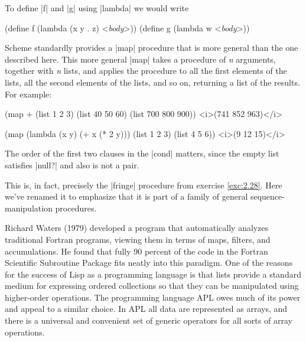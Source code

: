\begin{Exercise}
\begin{Exercise}
\begin{Exercise}
\begin{Exercise}
\begin{Exercise}
\begin{Exercise}
\begin{Exercise}
\begin{Exercise}
\begin{Exercise}
\begin{Exercise}
\begin{Exercise}
\begin{Exercise}
To define \scheme|f| and \scheme|g| using
\scheme|lambda| we would write
\begin{schemedisplay}
(define f (lambda (x y . z) <\textit{body}>))
(define g (lambda w <\textit{body}>))
\end{schemedisplay}

Scheme
standardly provides a \scheme|map| procedure that is more general
than the one described here.
This more general \scheme|map|
takes a procedure of \textit{n} arguments, together with \textit{n} lists, and
applies the procedure to all the first elements of
the lists, all the second elements of the lists, and so on,
returning a list of the results.  For example:
\begin{schemedisplay}
(map + (list 1 2 3) (list 40 50 60) (list 700 800 900))
<i>(741 852 963)</i>

(map (lambda (x y) (+ x (* 2 y)))
     (list 1 2 3)
     (list 4 5 6))
<i>(9 12 15)</i>
\end{schemedisplay}



The order of the
first two clauses in the \scheme|cond| matters, since the empty list
satisfies \scheme|null?| and also is not a pair.

This is, in fact, precisely the \scheme|fringe| procedure from
exercise \ref{exc:2.28}.  Here we've renamed it to emphasize that
it is part of a family of general sequence-manipulation procedures.

Richard Waters (1979)
developed a program that automatically analyzes traditional Fortran
programs, viewing them in terms of maps, filters, and accumulations.
He found that fully 90 percent of the code in the Fortran Scientific
Subroutine Package fits neatly into this paradigm.  One of the reasons
for the success of Lisp as a programming language is that lists
provide a standard medium for expressing ordered collections so that
they can be manipulated using higher-order operations.  The
programming language APL owes much of its power and appeal to a
similar choice. In APL all data are represented as arrays, and there is a
universal and convenient set of generic operators for all sorts of
array operations.


\end{Exercise}
\end{Exercise}
\end{Exercise}
\end{Exercise}
\end{Exercise}
\end{Exercise}
\end{Exercise}
\end{Exercise}
\end{Exercise}
\end{Exercise}
\end{Exercise}
\end{Exercise}
